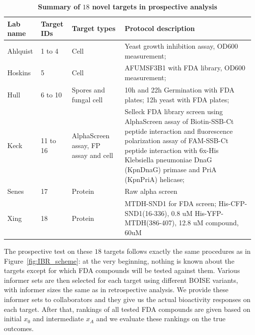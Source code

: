\documentclass[11pt,a4paper]{article}
\theoremstyle{plain}
\begin{document}
\begin{table}[ht!]
\centering
\caption{\label{tab:lab_tgt_summary}
{\bf Summary of $18$ novel targets in prospective analysis}}
\begin{tabular}{  p{3cm}  p{2cm}  p{3cm} p{6cm}}
        \toprule
\textbf{Lab name}  
& \textbf{Target IDs}
& \textbf{Target types}
& \textbf{Protocol description}\\\midrule
Ahlquist
& 1 to 4
& Cell
& Yeast growth inhibition assay, OD600 measurement;
\\\hline

Hoskins
& 5
& Cell
& AFUMSF3B1 with FDA library, OD600 measurement;
\\\hline

Hull
& 6 to 10
& Spores and fungal cell
& 10h and 22h Germination with FDA plates; 12h yeast with FDA plates;
\\\hline

Keck
& 11 to 16
& AlphaScreen assay, FP assay and cell
& Selleck FDA library screen using AlphaScreen assay of Biotin-SSB-Ct peptide interaction and fluorescence polarization assay of FAM-SSB-Ct peptide interaction with 6x-His Klebsiella pneumoniae DnaG (KpnDnaG) primase and PriA (KpnPriA) helicase;
\\\hline

Senes
& 17
& Protein
& Raw alpha screen
\\\hline

Xing
& 18
& Protein
& MTDH-SND1 for FDA screen; His-CFP-SND1(16-336), 0.8 uM His-YFP-MTDH(386-407), 12.8 uM compound, 60uM
\\\hline
\bottomrule
\end{tabular}
\end{table}

The prospective test on these $18$ targets follows exactly the same procedures as in Figure~\ref{fig:IBR_scheme}: at the very beginning, nothing is known about the targets except for which FDA compounds will be tested against them. Various informer sets are then selected for each target using different BOISE variants, with informer sizes the same as in retrospective analysis. We provide these informer sets to collaborators and they give us the actual bioactivity responses on each target. After that, rankings of all tested FDA compounds are given based on initial $x_0$ and intermediate $x_A$ and we evaluate these rankings on the true outcomes. 
\end{document}
